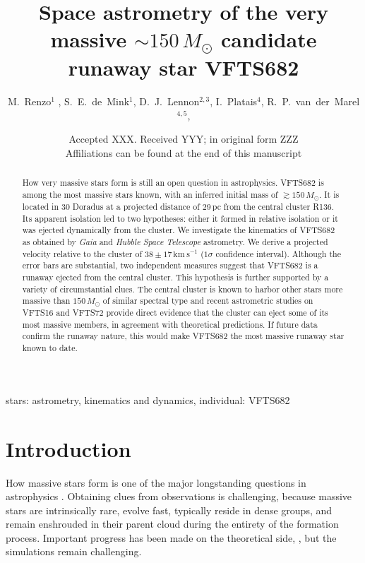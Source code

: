 \documentclass[a4paper,fleqn,usenatbib]{mnras}
\title[Space astrometry of the very massive $\sim$$150\,M_\odot$ candidate runaway star VFTS682]{Space astrometry of the very massive $\sim$$150\,M_\odot$  candidate runaway star VFTS682}
\author[Renzo et al.]{M.~Renzo$^{1}$%
  , S.~E.~de~Mink$^{1}$, D.~J.~Lennon$^{2,3}$, I.~Platais$^{4}$,
  R.~P.~van~der~Marel$^{4,5}$,
  \newauthor{E.~Laplace$^{1}$, J.~M.~Bestenlehner$^{6}$, C.~J.~Evans$^{7}$,
    V.~H\'enault-Brunet$^{8}$,  S.~Justham$^{9,10,1}$,
  }
\newauthor{A.~de~Koter$^{1}$,
      N.~Langer$^{11}$, F. Najarro$^{12}$, H.~Sana$^{13}$, F.~R.~N.~Schneider$^{14}$, J.~S.~Vink$^{15}$}}
\date{Accepted XXX. Received YYY; in original form ZZZ \\ Affiliations
can be found at the end of this manuscript}
\newcommand{\kms}{{\,\mathrm{km\ s^{-1}}}}
\begin{document}
\label{firsxtpage}
\pagerange{\pageref{firstpage}--\pageref{lastpage}}
\maketitle

\begin{abstract}
 
How very massive stars form is still an open question in
astrophysics. VFTS682 is among the most massive stars known,
with an inferred initial mass of $\gtrsim$$150\,M_\odot$. It is located
in 30 Doradus at a projected distance of 29\,pc from the central
cluster R136. 
Its apparent isolation led to two hypotheses: 
either it formed in relative isolation 
or it was ejected dynamically from the cluster. 
We investigate the kinematics of
VFTS682 as obtained by \emph{Gaia} and \emph{Hubble Space Telescope} astrometry. We derive a projected velocity relative to
the cluster of $38\pm17\kms$ ($1\sigma$ confidence interval). Although
the error bars are substantial, two independent measures
suggest that VFTS682 is a runaway
ejected from the central cluster. This hypothesis is further supported by a variety of
circumstantial clues. The central cluster is known to harbor 
other stars more massive than $150\,M_\odot$ of similar spectral
type and recent astrometric studies on VFTS16 and VFTS72
provide direct evidence that the cluster can eject some of its most
massive members, in agreement with theoretical predictions.
If future data confirm the runaway nature, this would make VFTS682
the most massive runaway star known to date. 
\end{abstract}

\begin{keywords}
  stars: astrometry, kinematics and dynamics, individual: VFTS682
\end{keywords}
\vspace{-30pt}
\section{Introduction}
\label{sec:intro}

How massive stars form is one of the major longstanding questions in astrophysics
\citep[e.g.,][]{zinnecker:07}. %
%
Obtaining clues from observations is challenging, because massive stars are intrinsically rare, 
evolve fast, typically reside in dense groups, and remain enshrouded in
their parent cloud during the entirety of the formation
process. Important progress has been made on the theoretical side,
\citep[e.g.][]{bate:09,kuiper:15,rosen:16}, but the simulations %
remain challenging.  
\end{document}
